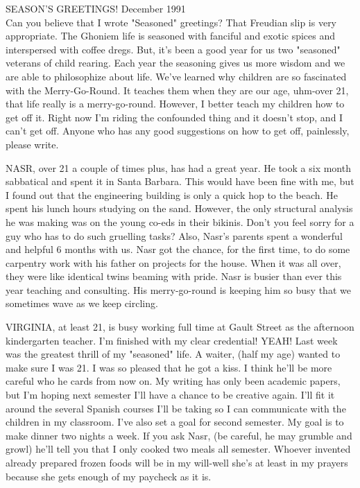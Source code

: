 
%

SEASON'S GREETINGS! \hfill December 1991\\

Can you believe that I wrote "Seasoned" greetings? That Freudian slip is very appropriate. The Ghoniem life is seasoned with fanciful and exotic
spices and interspersed with coffee dregs. But, it's been a good year for us two "seasoned" veterans of child rearing. Each year the seasoning
gives us more wisdom and we are able to philosophize about life. We've learned why children are so fascinated with the Merry-Go-Round. It
teaches them when they are our age, uhm-over 21, that life really is a merry-go-round. However, I better teach my children how to get off it.
Right now I'm riding the confounded thing and it doesn't stop, and I can't get off. Anyone who has any good suggestions on how to get off,
painlessly, please write.

NASR, over 21 a couple of times plus, has had a great year. He took a six month sabbatical and spent it in Santa Barbara. This would have been
fine with me, but I found out that the engineering building is only a quick hop to the beach. He spent his lunch hours studying on the sand.
However, the only structural analysis he was making was on the young co-eds in their bikinis. Don't you feel sorry for a guy who has to do such
gruelling tasks? Also, Nasr's parents spent a wonderful and helpful 6 months with us. Nasr got the chance, for the first time, to do some
carpentry work with his father on projects for the house. When it was all over, they were like identical twins beaming with pride. Nasr is
busier than ever this year teaching and consulting. His merry-go-round is keeping him so busy that we sometimes wave as we keep circling.

VIRGINIA, at least 21, is busy working full time at Gault Street as the afternoon kindergarten teacher. I'm finished with my clear credential!
YEAH! Last week was the greatest thrill of my "seasoned" life. A waiter, (half my age) wanted to make sure I was 21. I was so pleased that he
got a kiss. I think he'll be more careful who he cards from now on. My writing has only been academic papers, but I'm hoping next semester I'll
have a chance to be creative again. I'll fit it around the several Spanish courses I'll be taking so I can communicate with the children in my
classroom. I've also set a goal for second semester. My goal is to make dinner two nights a week. If you ask Nasr, (be careful, he may grumble
and growl) he'll tell you that I only cooked two meals all semester. Whoever invented already prepared frozen foods will be in my will-well
she's at least in my prayers because she gets enough of my paycheck as it is.

